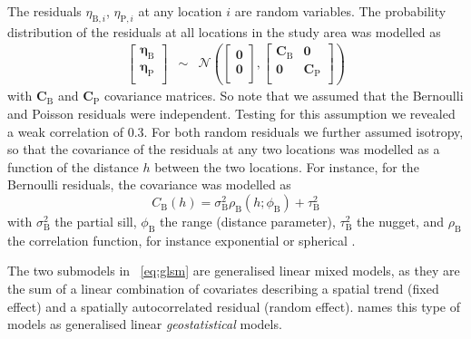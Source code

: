 \documentclass[review]{elsarticle}
\begin{document}
The residuals $\eta_{\mathrm{B},i}$, $\eta_{\mathrm{P},i}$ at any location $i$ are random variables. The probability distribution of the residuals at all locations in the study area was modelled as
\begin{eqnarray}
\left[
\begin{array}{c}
\boldsymbol{\eta}_{\mathrm{B}} \\
\boldsymbol{\eta}_{\mathrm{P}} \\
\end{array}
\right]&\sim& \mathcal{N}\left(
\left[
\begin{array}{c}
\mathbf{0} \\
\mathbf{0} \\
\end{array}
\right],
\left[
\begin{array}{cc}
\mathbf{C}_{\mathrm{B}} & \mathbf{0} \\
\mathbf{0} & \mathbf{C}_{\mathrm{P}} \\
\end{array}
\right]
\right)
\end{eqnarray}
with $\mathbf{C}_{\mathrm{B}}$ and $\mathbf{C}_{\mathrm{P}}$ covariance matrices. So note that we assumed that the Bernoulli and Poisson residuals were independent. Testing for this assumption we revealed a weak correlation of 0.3. For both random residuals we further assumed isotropy, so that the covariance of the residuals at any two locations was modelled as a function of the distance $h$ between the two locations. For instance, for the Bernoulli residuals, the covariance was modelled as
\begin{equation}
    C_{\mathrm{B}}(h)=\sigma_{\mathrm{B}}^{2}\rho_{\mathrm{B}}(h; \phi_{\mathrm{B}})+\tau_{\mathrm{B}}^{2} \label{Ch}
\end{equation}
with $\sigma_{\mathrm{B}}^{2}$ the partial sill, $\phi_{\mathrm{B}}$ the range (distance parameter), $\tau_{\mathrm{B}}^{2}$ the nugget, and $\rho_{\mathrm{B}}$ the correlation function, for instance exponential or spherical \citep{webster2007}.

The two submodels in ~\ref{eq:glsm} are generalised linear mixed models, as they are the sum of a linear combination of covariates describing a spatial trend (fixed effect) and a spatially autocorrelated residual (random effect). \citet{diggle2007} names this type of models as generalised linear \textit{geostatistical} models.
\end{document}
